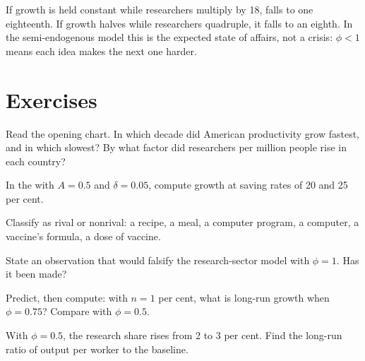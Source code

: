 If growth is held constant while researchers multiply by 18,  falls to one eighteenth. If growth halves while researchers
quadruple, it falls to an eighth. In the semi-endogenous model this is the expected state of affairs, not a crisis: $\phi < 1$ means each idea makes
the next one harder.

\section{Exercises}\label{sec:b2:endogenous-growth:exercises}

\begin{exercise}[$\star$]\label{exo:b2:endogenous-growth:1}
Read the opening chart. In which decade did American productivity grow fastest, and in which slowest? By what factor did
researchers per million people rise in each country?
\end{exercise}

\begin{exercise}[$\star$]\label{exo:b2:endogenous-growth:2}
In the  with $A = 0.5$ and $\delta = 0.05$, compute growth at saving rates of 20 and 25 per cent.
\end{exercise}

\begin{exercise}[$\star$]\label{exo:b2:endogenous-growth:3}
Classify as rival or nonrival: a recipe, a meal, a computer program, a computer, a vaccine's formula, a dose of vaccine.
\end{exercise}

\begin{exercise}[$\star$]\label{exo:b2:endogenous-growth:4}
State an observation that would falsify the research-sector model with $\phi = 1$. Has it been made?
\end{exercise}

\begin{exercise}[$\star\star$]\label{exo:b2:endogenous-growth:5}
Predict, then compute: with $n = 1$ per cent, what is long-run growth when $\phi = 0.75$? Compare with $\phi = 0.5$.
\end{exercise}

\begin{exercise}[$\star\star$]\label{exo:b2:endogenous-growth:6}
With $\phi = 0.5$, the research share rises from 2 to 3 per cent. Find the long-run ratio of output per worker to the baseline.
\end{exercise}

